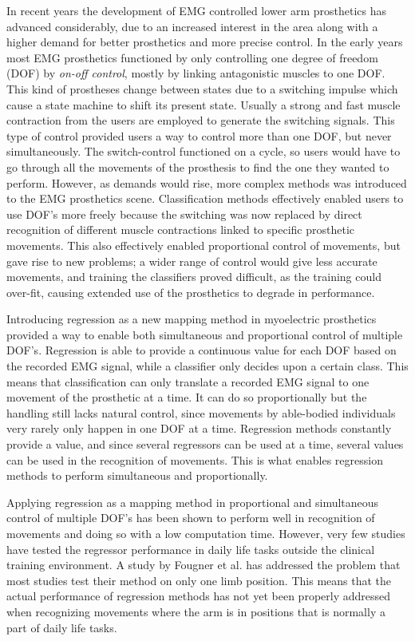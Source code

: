 In recent years the development of EMG controlled lower arm prosthetics has advanced considerably, due to an increased interest in the area along with a higher demand for better prosthetics and more precise control. \cite{Fougner2012} In the early years most EMG prosthetics functioned by only controlling one degree of freedom (DOF) by \textit{on-off control}, mostly by linking antagonistic muscles to one DOF. This kind of prostheses change between states due to a switching impulse which cause a state machine to shift its present state. Usually a strong and fast muscle contraction from the users are employed to generate the switching signals. \cite{amsuess2014}
This type of control provided users a way to control more than one DOF, but never simultaneously. The switch-control functioned on a cycle, so users would have to go through all the movements of the prosthesis to find the one they wanted to perform. However, as demands would rise, more complex methods was introduced to the EMG prosthetics scene. Classification methods effectively enabled users to use DOF's more freely because the switching was now replaced by direct recognition of different muscle contractions linked to specific prosthetic movements. This also effectively enabled proportional control of movements, but gave rise to new problems; a wider range of control would give less accurate movements, and training the classifiers proved difficult, as the training could over-fit, causing extended use of the prosthetics to degrade in performance. \cite{Ison2016}

Introducing regression as a new mapping method in myoelectric prosthetics provided a way to enable both simultaneous and proportional control of multiple DOF's. Regression is able to provide a continuous value for each DOF based on the recorded EMG signal, while a classifier only decides upon a certain class. \cite{hahne2014, jiang2010}
This means that classification can only translate a recorded EMG signal to one movement of the prosthetic at a time. It can do so proportionally but the handling still lacks natural control, since movements by able-bodied individuals very rarely only happen in one DOF at a time. Regression methods constantly provide a value, and since several regressors can be used at a time, several values can be used in the recognition of movements. This is what enables regression methods to perform simultaneous and proportionally. 

Applying regression as a mapping method in proportional and simultaneous control of multiple DOF's has been shown to perform well in recognition of movements and doing so with a low computation time. \cite{hahne2014} However, very few studies have tested the regressor performance in daily life tasks outside the clinical training environment. \cite{jiang2012} A study by Fougner et al. \cite{Fougner2011} has addressed the problem that most studies test their method on only one limb position. This means that the actual performance of regression methods has not yet been properly addressed when recognizing movements where the arm is in positions that is normally a part of daily life tasks. 

